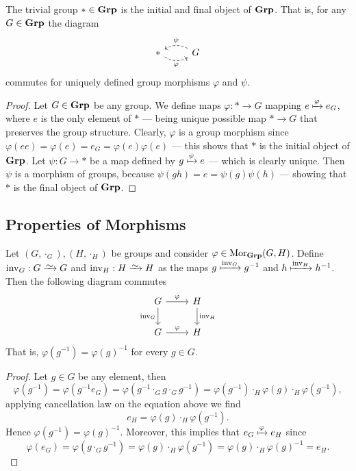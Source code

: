 \begin{proposition}
The trivial group \(* \in {\textbf{Grp}}\) is the initial and final object of \({\textbf{Grp}}\).
That is, for any \(G \in {\textbf{Grp}}\) the diagram
\[
  \begin{tikzcd}
    * \ar[r, dashed, bend right, swap, "\varphi"]
    &G \ar[l, dashed, bend right, swap, "\psi"]
  \end{tikzcd}
\]
commutes for uniquely defined group morphisms \(\varphi\) and \(\psi\).
\end{proposition}

\begin{proof}
Let \(G \in {\textbf{Grp}}\) be any group. We define maps \(\varphi: * \to G\) mapping
\(e \xmapsto\varphi e_G\), where \(e\) is the only element of \(*\) --- being
unique possible map \(* \to G\) that preserves the group structure. Clearly,
\(\varphi\) is a group morphism since \(\varphi(e e) = \varphi(e) = e_G =
\varphi(e) \varphi(e)\) --- this shows that \(*\) is the initial object of
\({\textbf{Grp}}\). Let \(\psi: G \to *\) be a map defined by \(g \xmapsto\psi e\) ---
which is clearly unique. Then \(\psi\) is a morphism of groups, because
\(\psi(g h) = e = \psi(g) \psi(h)\) --- showing that \(*\) is the final object
of \({\textbf{Grp}}\).
\end{proof}

\subsection{Properties of Morphisms}

\begin{proposition}
\label{prop:grp-morphism-commute-inverse}
Let \((G, \cdot_G), (H, \cdot_H)\) be groups and consider \(\varphi \in
\operatorname{Mor}_{\textbf{Grp}}(G, H)\). Define \(\operatorname{inv}_G: G \isoto G\) and
\(\operatorname{inv}_H: H \isoto H\) as the maps \(g \xmapsto
{\operatorname{inv}_G} g^{-1}\) and \(h \xmapsto {\operatorname{inv}_H}
h^{-1}\). Then the following diagram commutes
\[
  \begin{tikzcd}
    G \ar[r, "\varphi"]
    \ar[d, swap, "\operatorname{inv}_G"]
    &H \ar[d, "\operatorname{inv}_H"] \\
    G \ar[r, "\varphi"] &H
  \end{tikzcd}
\]
That is, \(\varphi(g^{-1}) = \varphi(g)^{-1}\) for every \(g \in G\).
\end{proposition}

\begin{proof}
Let \(g \in G\) be any element, then
\[
  \varphi(g^{-1}) = \varphi(g^{-1} e_G) = \varphi(g^{-1} \cdot_G g
  \cdot_G g^{-1}) = \varphi(g^{-1}) \cdot_H \varphi(g) \cdot_H
  \varphi(g^{-1}),
\]
applying cancellation law on the equation above we find
\[
  e_H = \varphi(g) \cdot_H \varphi(g^{-1}).
\]
Hence \(\varphi(g^{-1}) = {\varphi(g)}^{-1}\). Moreover, this implies that \(e_G
\xmapsto \varphi e_H\) since
\[
  \varphi(e_G) = \varphi(g \cdot_G g^{-1}) = \varphi(g) \cdot_H
  \varphi(g^{-1}) = \varphi(g) \cdot_H {\varphi(g)}^{-1} = e_H.
\]
\end{proof}

